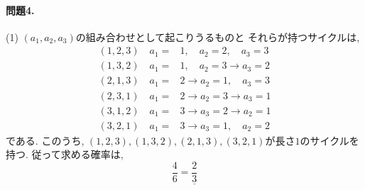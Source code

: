 \documentclass[11pt]{jarticle}
\begin{document}
\title{}
\date{}
\maketitle
\paragraph{問題4.}
(1) $(a_1, a_2, a_3)$の組み合わせとして起こりうるものと
それらが持つサイクルは, 
\begin{align*}
  (1, 2, 3) \quad a_1=& 1,\quad a_2= 2,\quad a_3= 3 \\
  (1, 3, 2) \quad a_1=& 1,\quad a_2= 3 \to a_3= 2 \\
  (2, 1, 3) \quad a_1=& 2 \to a_2= 1,\quad a_3= 3 \\
  (2, 3, 1) \quad a_1=& 2 \to a_2= 3 \to a_3= 1 \\
  (3, 1, 2) \quad a_1=& 3 \to a_3= 2 \to a_2= 1 \\
  (3, 2, 1) \quad a_1=& 3 \to a_3= 1,\quad a_2= 2
\end{align*}
である. このうち, $(1,2,3), (1,3,2), (2,1,3), (3,2,1)$が長さ$1$のサイクルを持つ. 
従って求める確率は, 
\begin{equation*}
  \frac{4}{6} = \underline{\frac{2}{3}}
\end{equation*}
\end{document}
